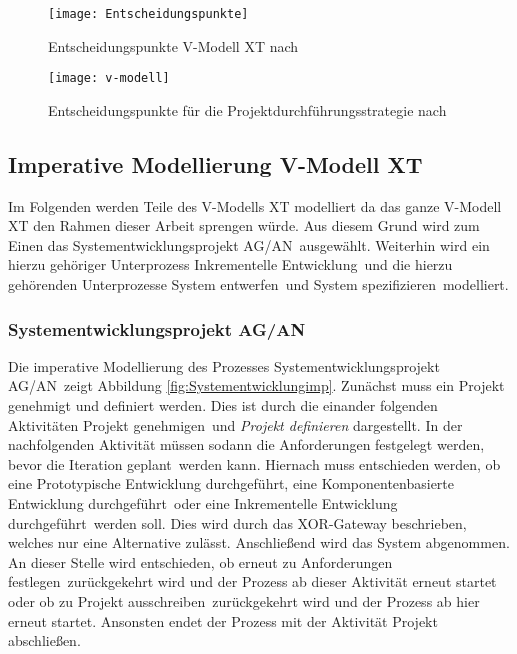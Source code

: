  
 
 \begin{figure}[!htbp]
\begin{center}
  \texttt{[image: Entscheidungspunkte]} %
  \caption{Entscheidungspunkte V-Modell XT nach \cite{2004vmodell}}
  \label{fig:entscheidungspunkte}
\end{center}
\end{figure}
 
\begin{sidewaysfigure}[!htbp]
\begin{center}
  \texttt{[image: v-modell]} %
  \caption{Entscheidungspunkte für die Projektdurchführungsstrategie nach \cite{2004vmodell}}
  \label{fig:v-modell}
\end{center}
\end{sidewaysfigure}


\clearpage

\subsection{Imperative Modellierung V-Modell XT}

Im Folgenden werden Teile des V-Modells XT modelliert da das ganze V-Modell XT den Rahmen dieser Arbeit sprengen würde. Aus diesem Grund wird zum Einen das \grqq Systementwicklungsprojekt AG/AN\grqq \ ausgewählt. Weiterhin wird ein hierzu gehöriger Unterprozess \grqq Inkrementelle Entwicklung\grqq \ und die hierzu gehörenden Unterprozesse \grqq System entwerfen\grqq \ und \grqq System spezifizieren\grqq \ modelliert.

\subsubsection{Systementwicklungsprojekt AG/AN}


Die imperative Modellierung des Prozesses \grqq Systementwicklungsprojekt AG/AN\grqq \ zeigt Abbildung \ref{fig:Systementwicklungimp}. \newline
Zunächst muss ein Projekt genehmigt und definiert werden. Dies ist durch die einander folgenden Aktivitäten \grqq Projekt genehmigen\grqq \ und \textit{Projekt definieren} dargestellt.\newline
In der nachfolgenden Aktivität müssen sodann die \grqq Anforderungen festgelegt werden\grqq, bevor die \grqq Iteration geplant\grqq \ werden kann. \newline
Hiernach muss entschieden werden, ob eine \grqq Prototypische Entwicklung durchgeführt\grqq, eine \grqq Komponentenbasierte Entwicklung durchgeführt\grqq \ oder eine \grqq Inkrementelle Entwicklung durchgeführt\grqq \ werden soll. Dies wird durch das XOR-Gateway beschrieben, welches nur eine Alternative zulässt.\newline
Anschließend wird das \grqq System abgenommen\grqq. An dieser Stelle wird entschieden, ob erneut zu \grqq Anforderungen festlegen\grqq \ zurückgekehrt wird und der Prozess ab dieser Aktivität erneut startet oder ob zu \grqq Projekt ausschreiben\grqq \ zurückgekehrt wird und der Prozess ab hier erneut startet. Ansonsten endet der Prozess mit der Aktivität \grqq Projekt abschließen\grqq.

